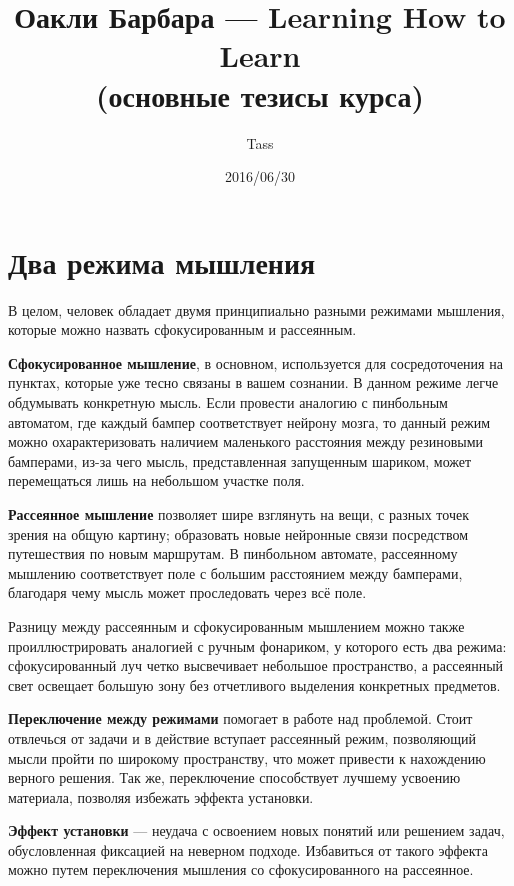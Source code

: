 \documentclass{article}
\begin{document}
\title{Оакли Барбара --- Learning How to Learn\\(основные тезисы курса)}
\author{Tass}
\date{2016/06/30}
\maketitle

\section{Два режима мышления}
В целом, человек обладает двумя принципиально разными режимами мышления, которые можно назвать сфокусированным и рассеянным.
\medskip

\textbf{Сфокусированное мышление}, в основном, используется для сосредоточения на пунктах, которые уже тесно связаны в вашем сознании. В данном режиме легче обдумывать конкретную мысль. Если провести аналогию с пинбольным автоматом, где каждый бампер соответствует нейрону мозга, то данный режим можно охарактеризовать наличием маленького расстояния между резиновыми бамперами, из-за чего мысль, представленная запущенным шариком, может перемещаться лишь на небольшом участке поля.
\medskip

\textbf{Рассеянное мышление} позволяет шире взглянуть на вещи, с разных точек зрения на общую картину; образовать новые нейронные связи посредством путешествия по новым маршрутам. В пинбольном автомате, рассеянному мышлению соответствует поле с большим расстоянием между бамперами, благодаря чему мысль может проследовать через всё поле.
\medskip

Разницу между рассеянным и сфокусированным мышлением можно также проиллюстрировать аналогией с ручным фонариком, у которого есть два режима: сфокусированный луч четко высвечивает небольшое пространство, а рассеянный свет освещает большую зону без отчетливого выделения конкретных предметов.
\medskip

\textbf{Переключение между режимами} помогает в работе над проблемой. Стоит отвлечься от задачи и в действие вступает рассеянный режим, позволяющий мысли пройти по широкому пространству, что может привести к нахождению верного решения. Так же, переключение способствует лучшему усвоению материала, позволяя избежать эффекта установки.
\medskip

\textbf{Эффект установки} --- неудача с освоением новых понятий или решением задач, обусловленная фиксацией на неверном подходе. Избавиться от такого эффекта можно путем переключения мышления со сфокусированного на рассеянное.
\end{document}
